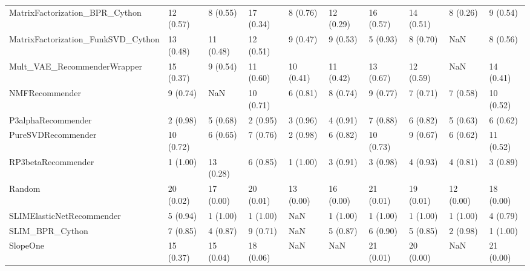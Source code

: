 \begin{tabular}{llllllllll}
     MatrixFactorization\_BPR\_Cython &                12 (0.57) &    8 (0.55) &     17 (0.34) &     8 (0.76) &            12 (0.29) &           16 (0.57) &         14 (0.51) &           8 (0.26) &          9 (0.54) \\
 MatrixFactorization\_FunkSVD\_Cython &                13 (0.48) &   11 (0.48) &     12 (0.51) &     9 (0.47) &             9 (0.53) &            5 (0.93) &          8 (0.70) &                NaN &          8 (0.56) \\
        Mult\_VAE\_RecommenderWrapper &                15 (0.37) &    9 (0.54) &     11 (0.60) &    10 (0.41) &            11 (0.42) &           13 (0.67) &         12 (0.59) &                NaN &         14 (0.41) \\
                     NMFRecommender &                 9 (0.74) &         NaN &     10 (0.71) &     6 (0.81) &             8 (0.74) &            9 (0.77) &          7 (0.71) &           7 (0.58) &         10 (0.52) \\
                 P3alphaRecommender &                 2 (0.98) &    5 (0.68) &      2 (0.95) &     3 (0.96) &             4 (0.91) &            7 (0.88) &          6 (0.82) &           5 (0.63) &          6 (0.62) \\
                 PureSVDRecommender &                10 (0.72) &    6 (0.65) &      7 (0.76) &     2 (0.98) &             6 (0.82) &           10 (0.73) &          9 (0.67) &           6 (0.62) &         11 (0.52) \\
                 RP3betaRecommender &                 1 (1.00) &   13 (0.28) &      6 (0.85) &     1 (1.00) &             3 (0.91) &            3 (0.98) &          4 (0.93) &           4 (0.81) &          3 (0.89) \\
                             Random &                20 (0.02) &   17 (0.00) &     20 (0.01) &    13 (0.00) &            16 (0.00) &           21 (0.01) &         19 (0.01) &          12 (0.00) &         18 (0.00) \\
          SLIMElasticNetRecommender &                 5 (0.94) &    1 (1.00) &      1 (1.00) &          NaN &             1 (1.00) &            1 (1.00) &          1 (1.00) &           1 (1.00) &          4 (0.79) \\
                    SLIM\_BPR\_Cython &                 7 (0.85) &    4 (0.87) &      9 (0.71) &          NaN &             5 (0.87) &            6 (0.90) &          5 (0.85) &           2 (0.98) &          1 (1.00) \\
                           SlopeOne &                15 (0.37) &   15 (0.04) &     18 (0.06) &          NaN &                  NaN &           21 (0.01) &         20 (0.00) &                NaN &         21 (0.00) \\

\end{tabular}

